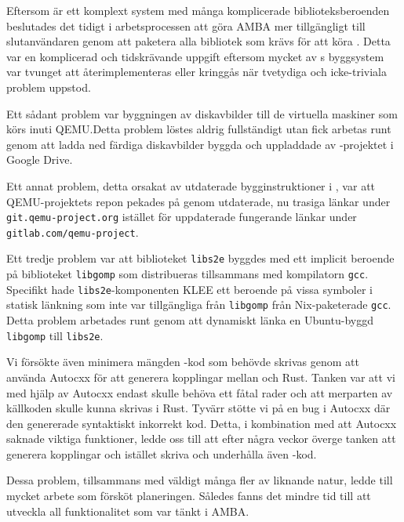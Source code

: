 Eftersom \stoe{} är ett komplext system med många komplicerade
biblioteksberoenden beslutades det tidigt i arbetsprocessen att göra AMBA mer
tillgängligt till slutanvändaren genom att paketera alla bibliotek som krävs för
att köra \stoe{}. Detta var en komplicerad och tidskrävande uppgift eftersom
mycket av \stoe{}s byggsystem var tvunget att återimplementeras eller kringgås
när tvetydiga och icke-triviala problem uppstod.

Ett sådant problem var byggningen av diskavbilder till de virtuella maskiner som
\stoe{} körs inuti QEMU.\@ Detta problem löstes aldrig fullständigt utan fick
arbetas runt genom att ladda ned färdiga diskavbilder byggda och uppladdade av
\stoe{}-projektet i Google Drive.

Ett annat problem, detta orsakat av utdaterade bygginstruktioner i \stoe{}, var
att QEMU-projektets repon pekades på genom utdaterade, nu trasiga länkar under
\texttt{git.qemu-project.org} istället för uppdaterade fungerande länkar under
\\\texttt{gitlab.com/qemu-project}.

Ett tredje problem var att biblioteket \texttt{libs2e} byggdes med ett implicit
beroende på biblioteket \texttt{libgomp} som distribueras tillsammans med
kompilatorn \texttt{gcc}. Specifikt hade \texttt{libs2e}-komponenten KLEE ett
beroende på vissa symboler i statisk länkning som inte var tillgängliga från
\texttt{libgomp} från Nix-paketerade \texttt{gcc}. Detta problem arbetades runt
genom att dynamiskt länka en Ubuntu-byggd \texttt{libgomp} till \texttt{libs2e}.

Vi försökte även minimera mängden -kod som behövde skrivas genom
att använda Autocxx för att generera kopplingar mellan  och Rust.
Tanken var att vi med hjälp av Autocxx endast skulle behöva ett fåtal rader
 och att merparten av källkoden skulle kunna skrivas i Rust.
Tyvärr stötte vi på en bug i Autocxx där den genererade syntaktiskt inkorrekt
kod. Detta, i kombination med att Autocxx saknade viktiga funktioner, ledde oss
till att efter några veckor överge tanken att generera kopplingar och istället
skriva och underhålla även -kod.

Dessa problem, tillsammans med väldigt många fler av liknande natur, ledde till
mycket arbete som försköt planeringen. Således fanns det mindre tid till att
utveckla all funktionalitet som var tänkt i AMBA.\@
